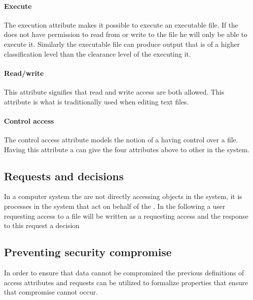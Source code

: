 \paragraph{Execute}
The execution attribute makes it possible to execute an executable file.
If the \principal{} does not have permission to read from or write to the file he will only be able to execute it.
Similarly the executable file can produce output that is of a higher classification level than the clearance level of the \principal{} executing it.

\paragraph{Read/write}
This attribute signifies that read and write access are both allowed.
This attribute is what is traditionally used when editing text files.

\paragraph{Control access}
The control access attribute models the notion of a \principal{} having control over a file.
Having this attribute a \principal{} can give the four attributes above to other \principals{} in the system.

\subsection{Requests and decisions}
In a computer system the \principals{} are not directly accessing objects in the system, it is processes in the system that act on behalf of the \principal{}.
In the following a user requesting access to a file will be written as a \principal{} requesting access and the response to this request a decision

\subsection{Preventing security compromise}\label{bellap:properties}
In order to ensure that data cannot be compromized the previous definitions of access attributes and requests can be utilized to formalize properties that ensure that compromise cannot occur.

